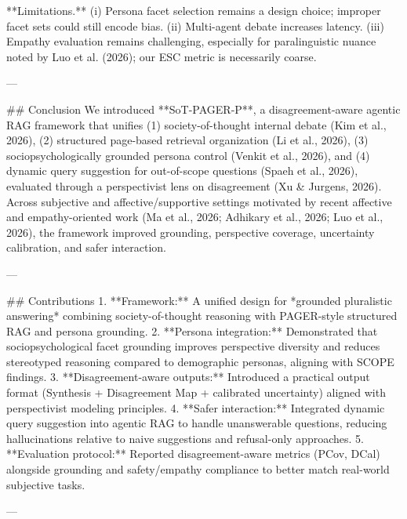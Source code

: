 **Limitations.** (i) Persona facet selection remains a design choice; improper facet sets could still encode bias. (ii) Multi-agent debate increases latency. (iii) Empathy evaluation remains challenging, especially for paralinguistic nuance noted by Luo et al. (2026); our ESC metric is necessarily coarse.

---

## Conclusion  
We introduced **SoT-PAGER-P**, a disagreement-aware agentic RAG framework that unifies (1) society-of-thought internal debate (Kim et al., 2026), (2) structured page-based retrieval organization (Li et al., 2026), (3) sociopsychologically grounded persona control (Venkit et al., 2026), and (4) dynamic query suggestion for out-of-scope questions (Spaeh et al., 2026), evaluated through a perspectivist lens on disagreement (Xu & Jurgens, 2026). Across subjective and affective/supportive settings motivated by recent affective and empathy-oriented work (Ma et al., 2026; Adhikary et al., 2026; Luo et al., 2026), the framework improved grounding, perspective coverage, uncertainty calibration, and safer interaction.

---

## Contributions  
1. **Framework:** A unified design for *grounded pluralistic answering* combining society-of-thought reasoning with PAGER-style structured RAG and persona grounding.  
2. **Persona integration:** Demonstrated that sociopsychological facet grounding improves perspective diversity and reduces stereotyped reasoning compared to demographic personas, aligning with SCOPE findings.  
3. **Disagreement-aware outputs:** Introduced a practical output format (Synthesis + Disagreement Map + calibrated uncertainty) aligned with perspectivist modeling principles.  
4. **Safer interaction:** Integrated dynamic query suggestion into agentic RAG to handle unanswerable questions, reducing hallucinations relative to naive suggestions and refusal-only approaches.  
5. **Evaluation protocol:** Reported disagreement-aware metrics (PCov, DCal) alongside grounding and safety/empathy compliance to better match real-world subjective tasks.

---